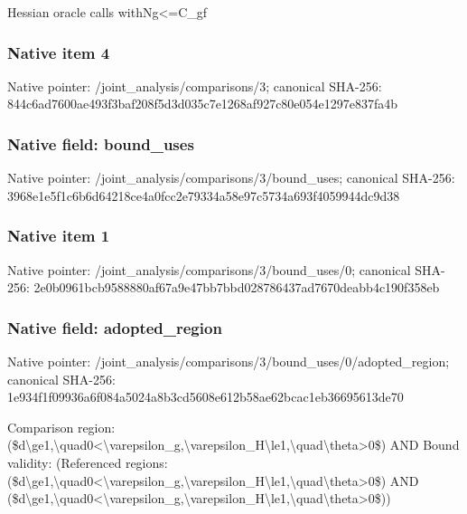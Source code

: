 \documentclass[10pt,a4paper]{article}
\begin{document}
\begingroup\raggedright{} Hessian oracle calls withNg<=\allowbreak{}C\_\allowbreak{}gf\par\endgroup

\subsubsection{Native item 4}
Native pointer: /joint\_\allowbreak{}analysis/comparisons/3; canonical SHA-256: 844c6ad7600ae493f3baf208f5d3d035c7e1268af927c80e054e1297e837fa4b

\subsubsection{Native field: bound\_\allowbreak{}uses}
Native pointer: /joint\_\allowbreak{}analysis/comparisons/3/bound\_\allowbreak{}uses; canonical SHA-256: 3968e1e5f1c6b6d64218ce4a0fcc2e79334a58e97c5734a693f4059944dc9d38

\subsubsection{Native item 1}
Native pointer: /joint\_\allowbreak{}analysis/comparisons/3/bound\_\allowbreak{}uses/0; canonical SHA-256: 2e0b0961bcb9588880af67a9e47bb7bbd028786437ad7670deabb4c190f358eb

\subsubsection{Native field: adopted\_\allowbreak{}region}
Native pointer: /joint\_\allowbreak{}analysis/comparisons/3/bound\_\allowbreak{}uses/0/adopted\_\allowbreak{}region; canonical SHA-256: 1e934f1f09936a6f084a5024a8b3cd5608e612b58ae62bcac1eb36695613de70

\begingroup\raggedright\sloppy Comparison region:\allowbreak{} (\$d\textbackslash{}ge1,\allowbreak{}\textbackslash{}quad0<\textbackslash{}varepsilon\_\allowbreak{}g,\allowbreak{}\textbackslash{}varepsilon\_\allowbreak{}H\textbackslash{}le1,\allowbreak{}\textbackslash{}quad\textbackslash{}theta>0\$) AND Bound validity:\allowbreak{} (Referenced regions:\allowbreak{} (\$d\textbackslash{}ge1,\allowbreak{}\textbackslash{}quad0<\textbackslash{}varepsilon\_\allowbreak{}g,\allowbreak{}\textbackslash{}varepsilon\_\allowbreak{}H\textbackslash{}le1,\allowbreak{}\textbackslash{}quad\textbackslash{}theta>0\$) AND (\$d\textbackslash{}ge1,\allowbreak{}\textbackslash{}quad0<\textbackslash{}varepsilon\_\allowbreak{}g,\allowbreak{}\textbackslash{}varepsilon\_\allowbreak{}H\textbackslash{}le1,\allowbreak{}\textbackslash{}quad\textbackslash{}theta>0\$))\par\endgroup
\end{document}
